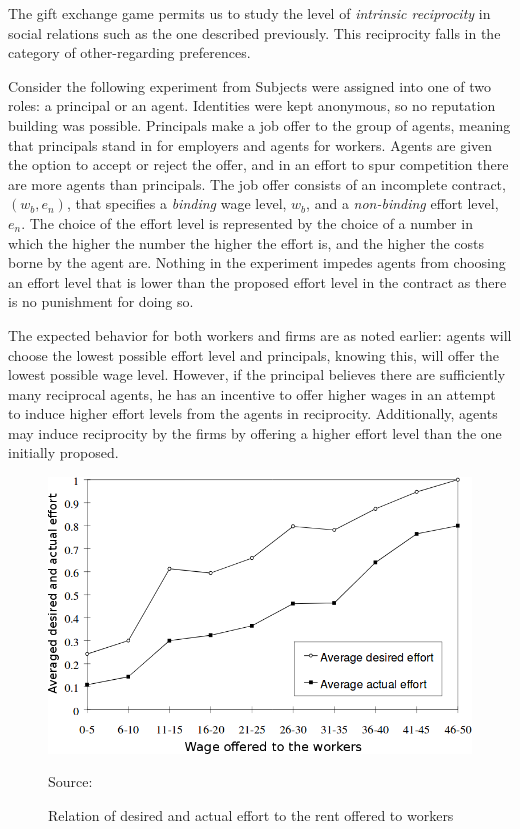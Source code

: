 \documentclass[12pt]{article}
\begin{document}
The gift exchange game permits us to study the level of \textit{intrinsic reciprocity} in social relations such as the one described previously. This reciprocity falls in the category of other-regarding preferences. 

Consider the following experiment from \cite{fehr1997} Subjects were assigned into one of two roles: a principal or an agent. Identities were kept anonymous, so no reputation building was possible. Principals make a job offer to the group of agents, meaning that principals stand in for employers and agents for workers.  Agents are given the option to accept or reject the offer, and in an effort to spur competition there are more agents than principals. The job offer consists of an incomplete contract, $\left ( w_b,e_n \right)$, that specifies a \textit{binding} wage level, $w_b$, and a \textit{non-binding} effort level, $e_n$. The choice of the effort level is represented by the choice of a number in which the higher the number the higher the effort is, and the higher the costs borne by the agent are. Nothing in the experiment impedes agents from choosing an effort level that is lower than the proposed effort level in the contract as there is no punishment for doing so. 

The expected behavior for both workers and firms are as noted earlier: agents will choose the lowest possible effort level and principals, knowing this, will offer the lowest possible wage level. However, if the principal believes there are sufficiently many reciprocal agents, he has an incentive to offer higher wages in an attempt to induce higher effort levels from the agents in reciprocity. Additionally, agents may induce reciprocity by the firms by offering a higher effort level than the one initially proposed.


\begin{figure}[H]
    \centering
    \caption{Relation of desired and actual effort to the rent offered to workers}
    \includegraphics[width=.9\textwidth]{gift1.png}
   
    Source: \cite{Fehr2002}
    \label{fig:gifteffort}
\end{figure}
\end{document}
